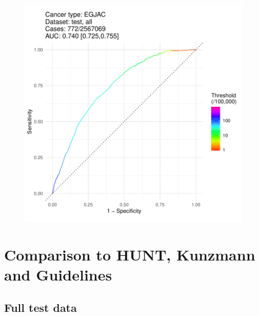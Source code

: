 \documentclass[english]{article}
\begin{document}
\begin{figure}[ht]
\includegraphics[width=1.0\linewidth]{roc/EGJAC_all.pdf}
\end{figure}




\newpage
\clearpage
\section{Comparison to HUNT, Kunzmann and Guidelines}

\subsection{Full test data}
\end{document}
